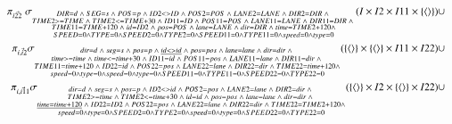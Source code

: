 \begin{eqnarray*}
&& \pi_{\vec{i22}} \;\sigma_{ \substack{DIR = d \;\wedge\; SEG = s \;\wedge\; POS = p \;\wedge\; ID2 <> ID \;\wedge\; POS2 = POS \;\wedge\; LANE2 = LANE \;\wedge\; DIR2 = DIR \;\wedge\; \\ TIME2 >= TIME \;\wedge\; TIME2 <= TIME + 30 \;\wedge\; ID11 = ID \;\wedge\; POS11 = POS \;\wedge\;  LANE11 = LANE \;\wedge\; DIR11=DIR \;\wedge\; \\TIME11 = TIME + 120 \;\wedge\; id = ID2 \;\wedge\; pos = POS \;\wedge\;  lane = LANE \;\wedge\; dir = DIR \;\wedge\; time = TIME2 + 120 \wedge \\SPEED = 0 \wedge TYPE = 0 \wedge SPEED2 = 0 \wedge TYPE2 = 0 \wedge  SPEED11 = 0 \wedge TYPE11 = 0 \wedge speed = 0 \wedge type =0 }}(I \times I2 \times I11 \times \{\tuple{} \} ) \cup \\
%
&& \pi_{\vec{i, i2}}\sigma_{\substack{dir = d \;\wedge\; seg = s \;\wedge\; pos = p \;\wedge\;\underline{ id <> id }\;\wedge\; pos = pos \;\wedge\; lane = lane \;\wedge\; dir = dir \;\wedge\; \\ time >= time \;\wedge\; time <= time + 30 \;\wedge\; ID11 = id \;\wedge\; POS11 = pos \;\wedge\;  LANE11 = lane \;\wedge\; DIR11= dir \;\wedge\; \\TIME11 = time + 120 \;\wedge\; ID22 = id \;\wedge\; POS22 = pos \;\wedge\;  LANE22 = lane \;\wedge\; DIR22 = dir \;\wedge\; TIME22 = time + 120 \wedge \\speed = 0 \wedge type = 0 \wedge speed = 0 \wedge type = 0 \wedge  SPEED11 = 0 \wedge TYPE11 = 0 \wedge SPEED22 = 0 \wedge TYPE22 =0 }}( \{\tuple{} \} \times  \{\tuple{} \} \times I11 \times I22) \cup \\
&& \pi_{\vec{i, i11}}\sigma_{\substack{dir = d \;\wedge\; seg = s \;\wedge\; pos = p \;\wedge\; ID2 <> id \;\wedge\; POS2 = pos \;\wedge\; LANE2 = lane \;\wedge\; DIR2 = dir \;\wedge\; \\ TIME2 >= time \;\wedge\; TIME2 <= time + 30 \;\wedge\; id = id \;\wedge\; pos = pos \;\wedge\;  lane = lane \;\wedge\; dir= dir \;\wedge\; \\\underline{ time = time + 120} \;\wedge\; ID22 = ID2 \;\wedge\; POS22 = pos \;\wedge\;  LANE22 = lane \;\wedge\; DIR22 = dir \;\wedge\; TIME22 = TIME2 + 120 \wedge \\speed = 0 \wedge type = 0 \wedge SPEED2 = 0 \wedge TYPE2 = 0 \wedge  speed = 0 \wedge type = 0 \wedge SPEED22 = 0 \wedge TYPE22 =0 }}( \{\tuple{} \} \times I2 \times \{\tuple{} \} \times I22) \cup \\

\end{eqnarray*}
